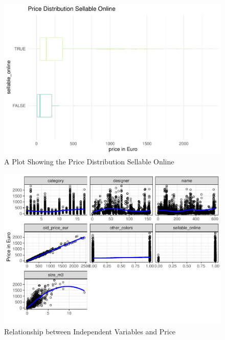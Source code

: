 \documentclass[a4paper, nobind]{templates/ociamthesis}
\begin{document}
\begin{figure}[!h]
\includegraphics[width=1\linewidth]{_main_files/figure-latex/price-dist-sellable-online-1} \caption{A Plot Showing the Price Distribution Sellable Online}\label{fig:price-dist-sellable-online}
\end{figure}

\begin{figure}[!h]
\includegraphics[width=1\linewidth]{_main_files/figure-latex/relationship-x-y-1} \caption{Relationship between Independent Variables and Price}\label{fig:relationship-x-y}
\end{figure}
\end{document}
